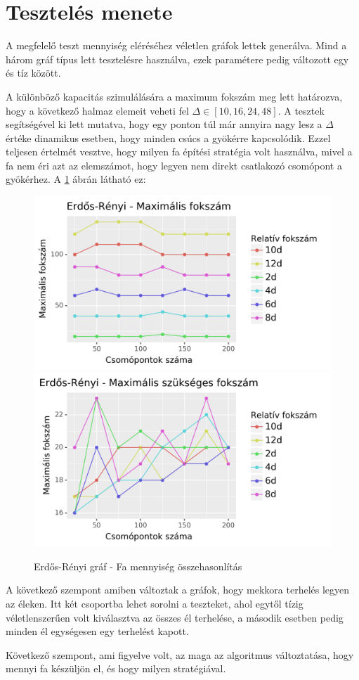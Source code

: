 \documentclass[12pt]{report}
\begin{document}
\section{Tesztelés menete}

A megfelelő teszt mennyiség eléréséhez véletlen gráfok lettek generálva. 
Mind a három gráf típus lett tesztelésre használva, ezek paramétere pedig változott egy és tíz között.

A különböző kapacitás szimulálására a maximum fokszám meg lett határozva, hogy a 
következő halmaz elemeit veheti fel $\Delta\in[10, 16, 24, 48]$.
A tesztek segítségével ki lett mutatva, hogy egy ponton túl már annyira nagy lesz a $\Delta$ értéke dinamikus esetben, hogy minden csúcs a gyökérre kapcsolódik.
Ezzel teljesen értelmét vesztve, hogy milyen fa építési stratégia volt használva, mivel a fa nem éri azt az elemszámot, hogy legyen nem direkt csatlakozó csomópont a gyökérhez. 
A \ref{delta} ábrán látható ez:  

\begin{figure}[H]
	\begin{center}
		\includegraphics[width=0.49\linewidth]{pictures/delta_max.png}
		\includegraphics[width=0.49\linewidth]{pictures/delta_req.png}
		\caption{Erdős-Rényi gráf - Fa mennyiség összehasonlítás}
		\label{delta}
	\end{center}
\end{figure}

A következő szempont amiben változtak a gráfok, hogy mekkora terhelés legyen az éleken.
Itt két csoportba lehet sorolni a teszteket, ahol egytől tízig véletlenszerűen volt kiválasztva az összes él terhelése, a második esetben pedig minden él egységesen egy terhelést kapott.

Következő szempont, ami figyelve volt, az maga az algoritmus változtatása, hogy mennyi fa készüljön el, és hogy milyen stratégiával.
\end{document}
